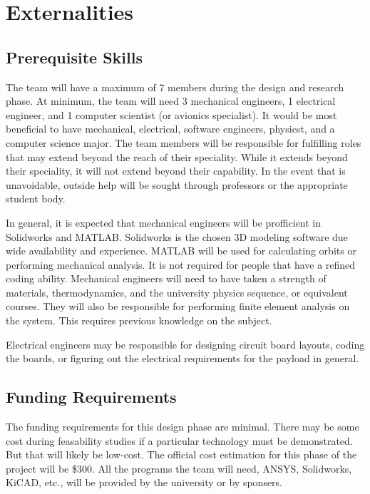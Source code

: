 \documentclass[conference]{IEEEtran} %
\begin{document}
\section{Externalities}
\subsection{Prerequisite Skills}
The team will have a maximum of 7 members during the design and research phase. At minimum, the team will need 3 mechanical engineers, 1 electrical engineer, and 1 computer scientist (or avionics specialist).
It would be most beneficial to have mechanical, electrical, software engineers, physicst, and a computer science major. The team members will be responsible for fulfilling roles
that may extend beyond the reach of their speciality. While it extends beyond their speciality, it will not extend beyond their capability. In the event that is unavoidable, outside
help will be sought through professors or the appropriate student body.

In general, it is expected that mechanical engineers will be profficient in Solidworks and MATLAB. Solidworks is the chosen 3D modeling software due wide availability and experience.
MATLAB will be used for calculating orbits or performing mechanical analysis. It is not required for people that have a refined coding ability. Mechanical engineers will need to
have taken a strength of materials, thermodynamics, and the university physics sequence, or equivalent courses. They will also be responsible for performing finite element analysis
on the system. This requires previous knowledge on the subject.

Electrical engineers may be responsible for designing circuit board layouts, coding the boards, or figuring out the electrical requirements for the payload in general.

\subsection{Funding Requirements}
The funding requirements for this design phase are minimal. There may be some cost during feasability studies if a particular technology must be demonstrated.
But that will likely be low-cost. The official cost estimation for this phase of the project will be \$300. All the programs the team will need, ANSYS, Solidworks, KiCAD, etc., will
be provided by the university or by sponsers.
\end{document}
